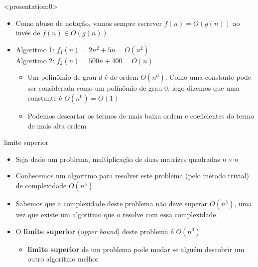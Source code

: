 \documentclass{beamer}
\begin{document}
\begin{frame}<presentation:0>

\begin{itemize}
 \item Como abuso de notação, vamos sempre escrever $f(n) = O(g(n))$ ao invés de $f(n) \in O(g(n))$
 \item Algoritmo 1: $f_1(n) = 2n^2 + 5n = O(n^2)$\\
 Algoritmo 2: $f_2(n) = 500n + 400 = O(n)$
 \begin{itemize}
  \item Um polinômio de grau $d$ é de ordem $O(n^d)$. Como uma constante pode ser considerada como um polinômio de grau 0, logo dizemos que uma constante é $O(n^0) = O(1)$
  \item Podemos descartar os termos de mais baixa ordem e coeficientes do termo de mais alta ordem
 \end{itemize}

\end{itemize}

\end{frame}

\begin{frame}{limite superior}

\begin{itemize}
 \item Seja dado um problema, multiplicação de duas matrizes quadradas $n \times n$
 \item Conhecemos um algoritmo para resolver este problema (pelo método trivial) de complexidade $O(n^3)$
 \item Sabemos que a complexidade deste problema não deve superar $O(n^3)$, uma vez que existe um algoritmo que o resolve com essa complexidade.
 \item O \textbf{limite superior} (\textit{upper bound}) deste problema é $O(n^3)$ 
\begin{itemize}
   \item \textbf{limite superior} de um problema pode mudar se alguém descobrir um outro algoritmo melhor
\end{itemize}

 \end{itemize}
\begin{center}
\end{center}
\end{frame}
\end{document}
